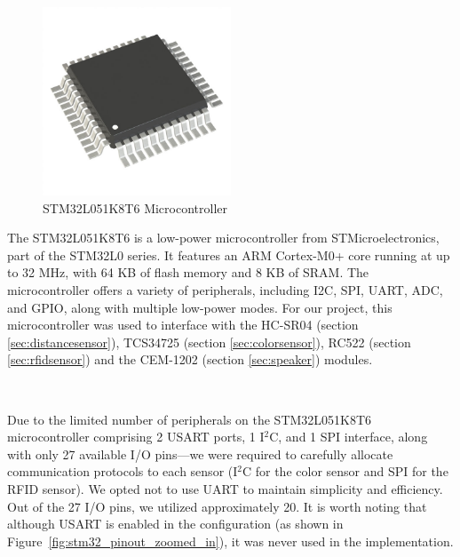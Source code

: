 \documentclass{article}
\begin{document}
\begin{figure}[H]
    \centering
    \includegraphics[width=0.5\textwidth]{Figures/stm32.jpg} %
    \caption{STM32L051K8T6 Microcontroller}
    \label{fig:stm32}
\end{figure}

The STM32L051K8T6 is a low-power microcontroller from STMicroelectronics, part of the STM32L0 series. It features an ARM Cortex-M0+ core running at up to 32 MHz, with 64 KB of flash memory and 8 KB of SRAM. The microcontroller offers a variety of peripherals, including I2C, SPI, UART, ADC, and GPIO, along with multiple low-power modes. For our project, this microcontroller was used to interface with the HC-SR04 (section \ref{sec:distancesensor}), TCS34725 (section \ref{sec:colorsensor}), RC522 (section \ref{sec:rfidsensor}) and the CEM-1202 (section \ref{sec:speaker}) modules.

\

Due to the limited number of peripherals on the STM32L051K8T6 microcontroller comprising 2 USART ports, 1 I$^2$C, and 1 SPI interface, along with only 27 available I/O pins—we were required to carefully allocate communication protocols to each sensor (I$^2$C for the color sensor and SPI for the RFID sensor). We opted not to use UART to maintain simplicity and efficiency. Out of the 27 I/O pins, we utilized approximately 20. It is worth noting that although USART is enabled in the configuration (as shown in Figure~\ref{fig:stm32_pinout_zoomed_in}), it was never used in the implementation.
\end{document}
